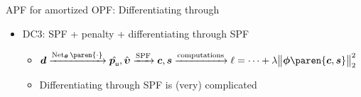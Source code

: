 \begin{frame}[t]{APF for amortized OPF: Differentiating through \APFE}{}
{\begin{itemize}
        \item <4-> \textcolor<4>{CornellRed}{DC3}:
            SPF + penalty + differentiating through SPF \cite{DC3}
        \begin{itemize}
            \item \(\DemDrws
                \xrightarrow{\operatorname{Net}_{\boldsymbol{\theta}}\paren{\cdot}}
                \hat{\SupPs},\hat{\BusMs} \xrightarrow{\text{SPF}}
                \SupInjs,\BusVolts \xrightarrow{\text{computations}}
                \ell = \cdots + \lambda
                \Norm*{\begin{matrix*}\Resids\paren{\SupInjs,\BusVolts}\end{matrix*}}_{2}^{2}
                \)
            \item[\faExclamation] Differentiating through SPF is (very) complicated
        \end{itemize}
        \end{itemize}
    }
\end{frame}

